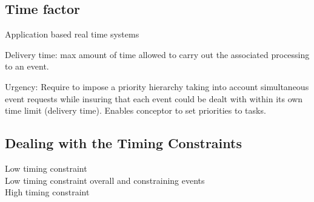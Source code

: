 \documentclass[10pt]{article}
\theoremstyle{plain}
\theoremstyle{definition}
\theoremstyle{remark}
\begin{document}
\subsection{Time factor}
Application based real time systems 
\begin{compactitem}
	\item Delivery time: max amount of time allowed to carry out the associated
		processing to an event.
	\item Urgency: Require to impose a priority hierarchy taking into account
		simultaneous event requests while insuring that each event could be
		dealt with within its own time limit (delivery time). Enables conceptor
		to set priorities to tasks.
\end{compactitem}

\subsection{Dealing with the Timing Constraints}
\begin{description}
	\item [Low timing constraint]
	\item[Low timing constraint overall and  constraining events]
	\item[High timing constraint]
\end{description}
\end{document}
